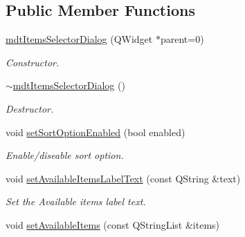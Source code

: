 \subsection*{Public Member Functions}
\begin{DoxyCompactItemize}
\item 
\hyperlink{classmdt_items_selector_dialog_abfe9a59eba04870635aff550e16a1e5b}{mdtItemsSelectorDialog} (QWidget $\ast$parent=0)
\begin{DoxyCompactList}\small\item\em Constructor. \end{DoxyCompactList}\item 
\hypertarget{classmdt_items_selector_dialog_a88d371fd132aaa5c67896ffc5c208d57}{
\hyperlink{classmdt_items_selector_dialog_a88d371fd132aaa5c67896ffc5c208d57}{$\sim$mdtItemsSelectorDialog} ()}
\label{classmdt_items_selector_dialog_a88d371fd132aaa5c67896ffc5c208d57}

\begin{DoxyCompactList}\small\item\em Destructor. \end{DoxyCompactList}\item 
\hypertarget{classmdt_items_selector_dialog_a831eda8f00130744ac60d324d61f3687}{
void \hyperlink{classmdt_items_selector_dialog_a831eda8f00130744ac60d324d61f3687}{setSortOptionEnabled} (bool enabled)}
\label{classmdt_items_selector_dialog_a831eda8f00130744ac60d324d61f3687}

\begin{DoxyCompactList}\small\item\em Enable/diseable sort option. \end{DoxyCompactList}\item 
\hypertarget{classmdt_items_selector_dialog_a05cf055e72c2d86a2cc7eb92afdcddbb}{
void \hyperlink{classmdt_items_selector_dialog_a05cf055e72c2d86a2cc7eb92afdcddbb}{setAvailableItemsLabelText} (const QString \&text)}
\label{classmdt_items_selector_dialog_a05cf055e72c2d86a2cc7eb92afdcddbb}

\begin{DoxyCompactList}\small\item\em Set the Available items label text. \end{DoxyCompactList}\item 
\hypertarget{classmdt_items_selector_dialog_a2d5184d36f2b0e7cfbea39b055b2e19d}{
void \hyperlink{classmdt_items_selector_dialog_a2d5184d36f2b0e7cfbea39b055b2e19d}{setAvailableItems} (const QStringList \&items)}
\label{classmdt_items_selector_dialog_a2d5184d36f2b0e7cfbea39b055b2e19d}


\end{DoxyCompactItemize}

